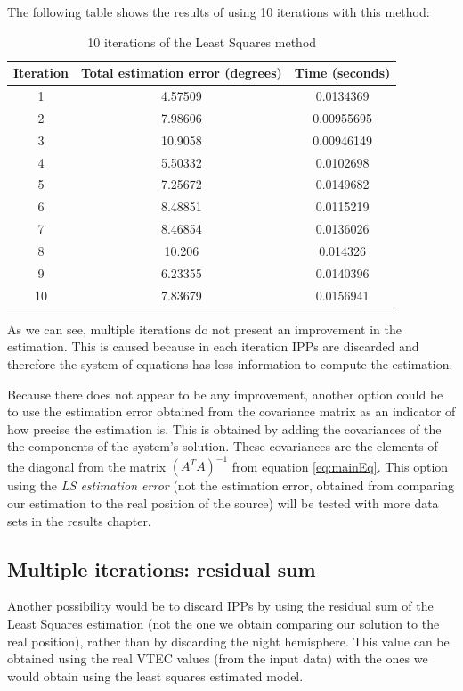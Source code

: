 The following table shows the results of using 10 iterations with this method:

\begin{table}[h!]
	\centering
	\def\arraystretch{1.2}
	\begin{tabular}{|c c c|} 
		\hline
		Iteration & Total estimation error (degrees) & Time (seconds) \\ [0.5ex] 
		\hline\hline
		1  & 4.57509 & 0.0134369 \\
		\hline
		2  & 7.98606 & 0.00955695 \\
		\hline
		3  & 10.9058 & 0.00946149 \\
		\hline
		4  & 5.50332 & 0.0102698 \\
		\hline
		5  & 7.25672 & 0.0149682 \\
		\hline
		6  & 8.48851 & 0.0115219 \\
		\hline
		7  & 8.46854 & 0.0136026 \\
		\hline
		8  & 10.206 & 0.014326 \\
		\hline
		9  & 6.23355 & 0.0140396 \\
		\hline
		10  & 7.83679 & 0.0156941 \\
		\hline
	\end{tabular}
	\caption{10 iterations of the Least Squares method}
\end{table}

As we can see, multiple iterations do not present an improvement in the estimation. This is caused because in each iteration IPPs are discarded and therefore the system of equations has less information to compute the estimation.

Because there does not appear to be any improvement, another option could be to use the estimation error obtained from the covariance matrix as an indicator of how precise the estimation is. This is obtained by adding the covariances of the the components of the system's solution. These covariances are the elements of the diagonal from the matrix $(A^{T}A)^{-1}$ from equation \ref{eq:mainEq}. This option using the \textit{LS estimation error} (not the estimation error, obtained from comparing our estimation to the real position of the source) will be tested with more data sets in the results chapter.

\subsection{Multiple iterations: residual sum}

Another possibility would be to discard IPPs by using the residual sum of the Least Squares estimation (not the one we obtain comparing our solution to the real position), rather than by discarding the night hemisphere. This value can be obtained using the real VTEC values (from the input data) with the ones we would obtain using the least squares estimated model.

